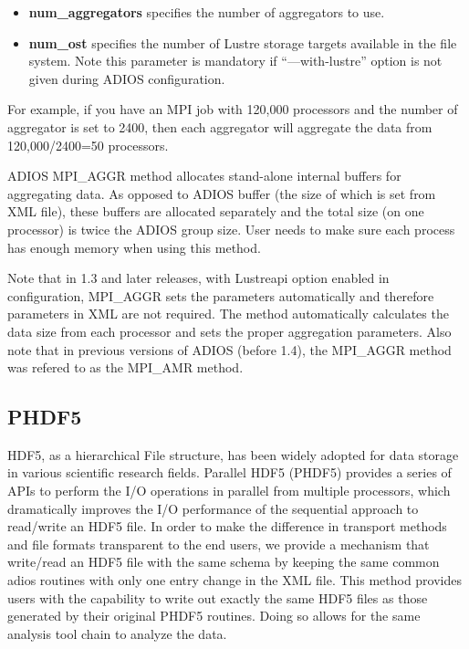 \begin{itemize}
\item \textbf{num\_aggregators} specifies the number of aggregators 
to use.
\item \textbf{num\_ost }specifies the number of Lustre storage targets 
 available in the file system. Note this parameter is mandatory if ``---with-lustre'' 
option is not given during ADIOS configuration.
\end{itemize}

For example, if you have an MPI job with 120,000 processors and the number of aggregator 
is set to 2400, then each aggregator will aggregate the data from 120,000/2400=50 
processors.

ADIOS MPI\_AGGR method allocates stand-alone internal buffers for aggregating data. 
As opposed to ADIOS buffer (the size of which is set from XML file), these buffers 
are allocated separately and the total size (on one processor) is twice the ADIOS 
group size. User needs to make sure each process has enough memory when using this 
method.  

Note that in 1.3 and later releases, with Lustreapi option enabled in configuration, 
MPI\_AGGR sets the parameters automatically and therefore parameters in XML are 
not required. The method automatically calculates the data size from each processor 
and sets the proper aggregation parameters. Also note that in previous versions
of ADIOS (before 1.4), the MPI\_AGGR method was refered to as the MPI\_AMR
method. 

\subsection{PHDF5}

HDF5, as a hierarchical File structure, has been widely adopted for data storage 
in various scientific research fields.  Parallel HDF5 (PHDF5) provides a series 
of APIs to perform the I/O operations in parallel from multiple processors, which 
dramatically improves the I/O performance of the sequential approach to read/write 
an HDF5 file. In order to make the difference in transport methods and file formats 
transparent to the end users, we provide a mechanism that write/read an HDF5 file 
with the same schema by keeping the same common adios routines with only one entry 
change in the XML file. This method provides users with the capability to write 
out exactly the same HDF5 files as those generated by their original PHDF5 routines. 
Doing so allows for the same analysis tool chain to analyze the data. 


